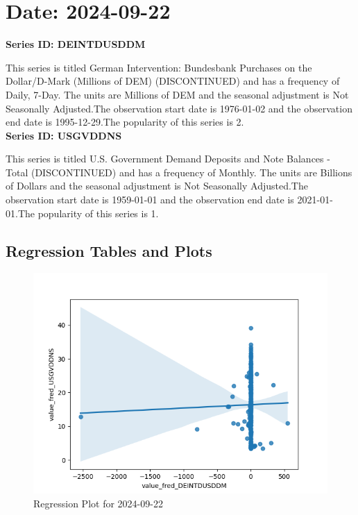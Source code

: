 \section{Date: 2024-09-22}
\noindent \textbf{Series ID: DEINTDUSDDM} 

\noindent This series is titled German Intervention: Bundesbank Purchases on the Dollar/D-Mark (Millions of DEM) (DISCONTINUED) and has a frequency of Daily, 7-Day. The units are Millions of DEM and the seasonal adjustment is Not Seasonally Adjusted.The observation start date is 1976-01-02 and the observation end date is 1995-12-29.The popularity of this series is 2. \\ 

\noindent \textbf{Series ID: USGVDDNS} 

\noindent This series is titled U.S. Government Demand Deposits and Note Balances - Total (DISCONTINUED) and has a frequency of Monthly. The units are Billions of Dollars and the seasonal adjustment is Not Seasonally Adjusted.The observation start date is 1959-01-01 and the observation end date is 2021-01-01.The popularity of this series is 1. \\ 

\subsection{Regression Tables and Plots}


\begin{figure}
\centering
\includegraphics[scale = 0.9]{plots/plot_2024-09-22.png}
\caption{Regression Plot for 2024-09-22}
\end{figure}
\newpage
